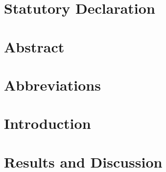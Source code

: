 \documentclass[12pt,twoside]{report}
\begin{document}
\cleardoublepage

  
\chapter*{Statutory Declaration}

\newpage


\pagestyle{plain}
\chapter*{Abstract}

  

\clearpage
\newpage
\chapter*{Abbreviations}

 

\newpage
\clearpage
{}
\tableofcontents 
\clearpage
\pagestyle{fancy}
 
 
\chapter{Introduction}

\chapter{Results and Discussion}

\end{document}
